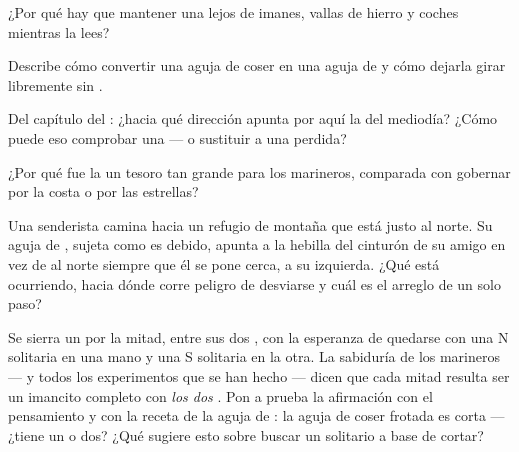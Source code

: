 \begin{exercise}[$\star$]\label{exo:g4:magnets-and-compass:6}
¿Por qué hay que mantener una  lejos de imanes, vallas de
hierro y coches mientras la lees?
\end{exercise}

\begin{exercise}[$\star$]\label{exo:g4:magnets-and-compass:7}
Describe cómo convertir una aguja de coser en una aguja de
 y cómo dejarla girar libremente sin .
\end{exercise}

\begin{exercise}[$\star$]\label{exo:g4:magnets-and-compass:8}
Del capítulo del : ¿hacia qué dirección apunta por aquí
la  del mediodía? ¿Cómo puede eso comprobar una  ---
o sustituir a una perdida?
\end{exercise}

\begin{exercise}[$\star$]\label{exo:g4:magnets-and-compass:9}
¿Por qué fue la  un tesoro tan grande para los marineros,
comparada con gobernar por la costa o por las estrellas?
\end{exercise}

\begin{exercise}[$\star\star$]\label{exo:g4:magnets-and-compass:10}
Una senderista camina hacia un refugio de montaña que está justo al
norte. Su aguja de , sujeta como es debido, apunta a la
hebilla del cinturón de su amigo en vez de al norte siempre que él se
pone cerca, a su izquierda. ¿Qué está ocurriendo, hacia dónde corre
peligro de desviarse y cuál es el arreglo de un solo paso?
\end{exercise}

\begin{exercise}[$\star\star$]\label{exo:g4:magnets-and-compass:11}
Se sierra un  por la mitad, entre sus dos , con la
esperanza de quedarse con una N solitaria en una mano y una S
solitaria en la otra. La sabiduría de los marineros --- y todos los
experimentos que se han hecho --- dicen que cada mitad resulta ser un
imancito completo con \emph{los dos} . Pon a prueba la
afirmación con el pensamiento y con la receta de la aguja de
: la aguja de coser frotada es corta --- ¿tiene un  o
dos? ¿Qué sugiere esto sobre buscar un  solitario a base de
cortar?
\end{exercise}
